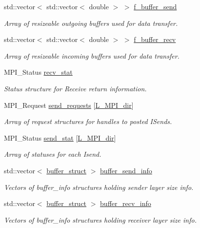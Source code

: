 \begin{DoxyCompactItemize}
std\+::vector$<$ std\+::vector$<$ double $>$ $>$ \hyperlink{class_mpi_manager_aafbb74832f69a915927b9bf252bd971d}{f\+\_\+buffer\+\_\+send}
\begin{DoxyCompactList}\small\item\em Array of resizeable outgoing buffers used for data transfer. \end{DoxyCompactList}\item 
std\+::vector$<$ std\+::vector$<$ double $>$ $>$ \hyperlink{class_mpi_manager_ab8f1eeab50fd4812b3a51af1a6c43713}{f\+\_\+buffer\+\_\+recv}
\begin{DoxyCompactList}\small\item\em Array of resizeable incoming buffers used for data transfer. \end{DoxyCompactList}\item 
M\+P\+I\+\_\+\+Status \hyperlink{class_mpi_manager_a257bc27e8099f1cbf5ac70b80d8eadaa}{recv\+\_\+stat}
\begin{DoxyCompactList}\small\item\em Status structure for Receive return information. \end{DoxyCompactList}\item 
M\+P\+I\+\_\+\+Request \hyperlink{class_mpi_manager_af096663b094d919caba62d4bdf8e7d88}{send\+\_\+requests} \mbox{[}\hyperlink{definitions_8h_a3310be18f0cfda9ca2a17c51518a97e9}{L\+\_\+\+M\+P\+I\+\_\+dir}\mbox{]}
\begin{DoxyCompactList}\small\item\em Array of request structures for handles to posted I\+Sends. \end{DoxyCompactList}\item 
M\+P\+I\+\_\+\+Status \hyperlink{class_mpi_manager_ab129fdffa1925677841f25bcd4507b5e}{send\+\_\+stat} \mbox{[}\hyperlink{definitions_8h_a3310be18f0cfda9ca2a17c51518a97e9}{L\+\_\+\+M\+P\+I\+\_\+dir}\mbox{]}
\begin{DoxyCompactList}\small\item\em Array of statuses for each Isend. \end{DoxyCompactList}\item 
std\+::vector$<$ \hyperlink{struct_mpi_manager_1_1buffer__struct}{buffer\+\_\+struct} $>$ \hyperlink{class_mpi_manager_a3a91c2e8cfb15027a0681c198f82d257}{buffer\+\_\+send\+\_\+info}
\begin{DoxyCompactList}\small\item\em Vectors of buffer\+\_\+info structures holding sender layer size info. \end{DoxyCompactList}\item 
std\+::vector$<$ \hyperlink{struct_mpi_manager_1_1buffer__struct}{buffer\+\_\+struct} $>$ \hyperlink{class_mpi_manager_a5e769fa077d24d62d10a9a0d303009d1}{buffer\+\_\+recv\+\_\+info}
\begin{DoxyCompactList}\small\item\em Vectors of buffer\+\_\+info structures holding receiver layer size info. \end{DoxyCompactList}\end{DoxyCompactItemize}
